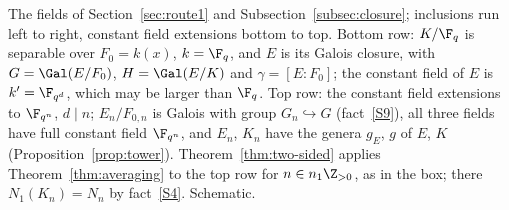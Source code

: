 \caption{The fields of Section~\ref{sec:route1} and
Subsection~\ref{subsec:closure}; inclusions run left to right, constant
field extensions bottom to top. Bottom row: $K/\F_q$ is separable over
$F_0=k(x)$, $k=\F_q$, and $E$ is its Galois closure, with $G=\Gal(E/F_0)$,
$H=\Gal(E/K)$ and $\gamma=[E:F_0]$; the constant field of $E$ is
$k'=\F_{q^d}$, which may be larger than $\F_q$. Top row: the constant field
extensions to $\F_{q^n}$, $d\mid n$; $E_n/F_{0,n}$ is Galois with group
$G_n\hookrightarrow G$ (fact~\ref{S9}), all three fields have full constant
field $\F_{q^n}$, and $E_n$, $K_n$ have the genera $g_E$, $g$ of $E$, $K$
(Proposition~\ref{prop:tower}). Theorem~\ref{thm:two-sided} applies
Theorem~\ref{thm:averaging} to the top row for $n\in n_1\Z_{>0}$, as in the
box; there $N_1(K_n)=N_n$ by fact~\ref{S4}. Schematic.}
\label{fig:cover-twists}
